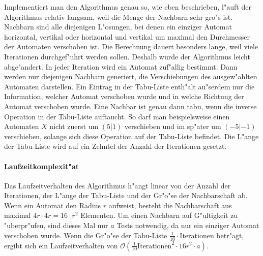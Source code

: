 Implementiert man den Algorithmus genau so, wie eben beschrieben, l"auft der Algorithmus relativ langsam, weil die Menge der Nachbarn sehr gro"s ist. Nachbarn sind alle diejenigen L"osungen, bei denen ein einziger Automat horizontal, vertikal oder horizontal und vertikal um maximal den Durchmesser der Automaten verschoben ist. Die Berechnung dauert besonders lange, weil viele Iterationen durchgef"uhrt werden sollen. Deshalb wurde der Algorithmus leicht abge"andert. In jeder Iteration wird ein Automat zuf"allig bestimmt. Dann werden nur diejenigen Nachbarn generiert, die Verschiebungen des ausgew"ahlten Automaten darstellen. Ein Eintrag in der Tabu-Liste enth"alt au"serdem nur die Information, welcher Automat verschoben wurde und in welche Richtung der Automat verschoben wurde. Eine Nachbar ist genau dann tabu, wenn die inverse Operation in der Tabu-Liste auftaucht. So darf man beispielsweise einen Automaten \(X\) nicht zuerst um \((5|1)\) verschieben und im sp"ater um \((-5|-1)\) verschieben, solange sich diese Operation auf der Tabu-Liste befindet. Die L"ange der Tabu-Liste wird auf ein Zehntel der Anzahl der Iterationen gesetzt. 

\paragraph{Laufzeitkomplexit"at}
Das Laufzeitverhalten des Algorithmus h"angt linear von der Anzahl der Iterationen, der L"ange der Tabu-Liste und der Gr"o"se der Nachbarschaft ab. Wenn ein Automat den Radius \(r\) aufweist, besteht die Nachbarschaft aus maximal \(4r \cdot 4r = 16 \cdot r^2\) Elementen. Um einen Nachbarn auf G"ultigkeit zu "uberpr"ufen, sind dieses Mal nur \(a\) Tests notwendig, da nur ein einziger Automat verschoben wurde. Wenn die Gr"o"se der Tabu-Liste \(\frac{1}{10} \cdot \mbox{Iterationen}\) betr"agt, ergibt sich ein Laufzeitverhalten von \(\mathcal{O}(\frac{1}{10} \mbox{Iterationen}^2 \cdot 16r^2 \cdot a)\).

